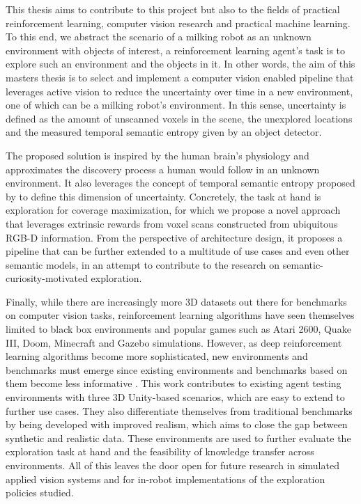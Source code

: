 This thesis aims to contribute to this project but also to the fields of practical reinforcement learning, computer vision research and practical machine learning. To this end, we abstract the scenario of a milking robot as an unknown environment with objects of interest, a reinforcement learning agent's task is to explore such an environment and the objects in it.
In other words, the aim of this masters thesis is to select and implement a computer vision enabled pipeline that leverages active vision to reduce the uncertainty over time in a new environment, one of which can be a milking robot's environment. In this sense, uncertainty is defined as the amount of unscanned voxels in the scene, the unexplored locations and the measured temporal semantic entropy given by an object detector.

The proposed solution is inspired by the human brain's physiology and approximates the discovery process a human would follow in an unknown environment. It also leverages the concept of temporal semantic entropy proposed by \textcite{chaplot2020semantic} to define this dimension of uncertainty. Concretely, the task at hand is exploration for coverage maximization, for which we propose a novel approach that leverages extrinsic rewards from voxel scans constructed from ubiquitous RGB-D information. From the perspective of architecture design, it proposes a pipeline that can be further extended to a multitude of use cases and even other semantic models, in an attempt to contribute to the research on semantic-curiosity-motivated exploration.

Finally, while there are increasingly more 3D datasets out there for benchmarks on computer vision tasks, reinforcement learning algorithms have seen themselves limited to black box environments and popular games such as Atari 2600, Quake III, Doom, Minecraft and Gazebo simulations. However, as deep reinforcement learning algorithms become more sophisticated, new environments and benchmarks must emerge since existing environments and benchmarks based on them become less informative \cite{juliani2018unity}. This work contributes to existing agent testing environments with three 3D Unity-based scenarios, which are easy to extend to further use cases. They also differentiate themselves from traditional benchmarks by being developed with improved realism, which aims to close the gap between synthetic and realistic data. These environments are used to further evaluate the exploration task at hand and the feasibility of knowledge transfer across environments. All of this leaves the door open for future research in simulated applied vision systems and for in-robot implementations of the exploration policies studied.

